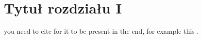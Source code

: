\section{Tytuł rozdziału I}

\lipsum[1-3]

you need to cite for it to be present in the end, for example this \cite{einstein}.